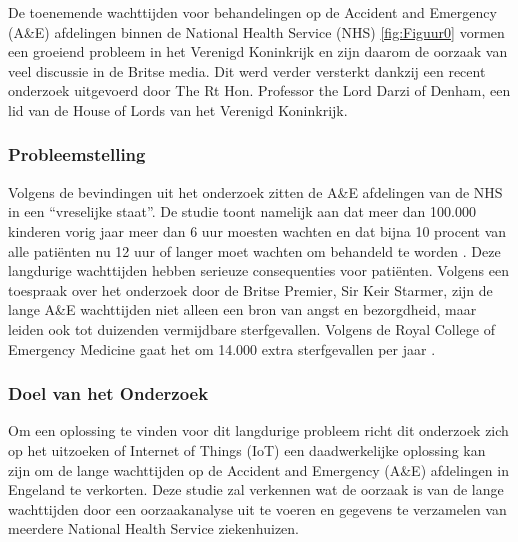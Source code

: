 


De toenemende wachttijden voor behandelingen op de Accident and Emergency (A\&E) afdelingen binnen de National Health Service (NHS) \ref{fig:Figuur0} vormen een groeiend probleem in het Verenigd Koninkrijk en zijn daarom de oorzaak van veel discussie in de Britse media. Dit werd verder versterkt dankzij een recent onderzoek uitgevoerd door The Rt Hon. Professor the Lord Darzi of Denham, een lid van de House of Lords van het Verenigd Koninkrijk.

\subsubsection*{Probleemstelling}
Volgens de bevindingen uit het onderzoek zitten de A\&E afdelingen van de NHS in een “vreselijke staat”. De studie toont namelijk aan dat meer dan 100.000 kinderen vorig jaar meer dan 6 uur moesten wachten en dat bijna 10 procent van alle patiënten nu 12 uur of langer moet wachten om behandeld te worden \autocite{LordDarzi2024}. Deze langdurige wachttijden hebben serieuze consequenties voor patiënten. Volgens een toespraak over het onderzoek door de Britse Premier, Sir Keir Starmer, zijn de lange A\&E wachttijden niet alleen een bron van angst en bezorgdheid, maar leiden ook tot duizenden vermijdbare sterfgevallen. Volgens de Royal College of Emergency Medicine gaat het om 14.000 extra sterfgevallen per jaar \autocite{Starmer2024}.

\subsubsection*{Doel van het Onderzoek}
Om een oplossing te vinden voor dit langdurige probleem richt dit onderzoek zich op het uitzoeken of Internet of Things (IoT) een daadwerkelijke oplossing kan zijn om de lange wachttijden op de Accident and Emergency (A\&E) afdelingen in Engeland te verkorten. Deze studie zal verkennen wat de oorzaak is van de lange wachttijden door een oorzaakanalyse uit te voeren en gegevens te verzamelen van meerdere National Health Service ziekenhuizen. 

